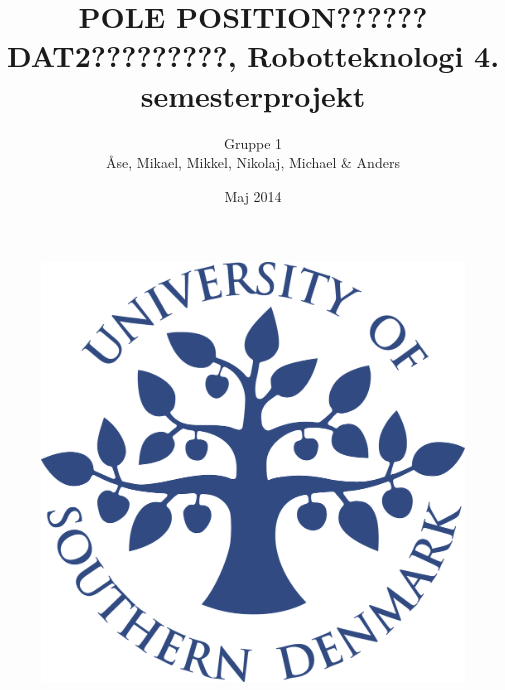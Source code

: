 \title{POLE POSITION?????? \\ DAT2?????????, Robotteknologi 4. semesterprojekt}
\author{Gruppe 1 \\ Åse, Mikael, Mikkel, Nikolaj, Michael \& Anders}
\date{Maj 2014}
\begin{figure}
\centering
\includegraphics[width=1\textwidth]{graphics/forside.png}
\end{figure}
\maketitle



